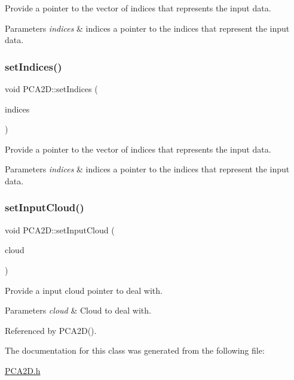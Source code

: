 Provide a pointer to the vector of indices that represents the input data. 


\begin{DoxyParams}{Parameters}
{\em indices} & indices a pointer to the indices that represent the input data. \\
\hline
\end{DoxyParams}
\mbox{\label{classPCA2D_aa5b9ccb12b5ce673ac851a2a5c4f4f97}} 
\subsubsection{\texorpdfstring{set\+Indices()}{setIndices()}\hspace{0.1cm}{\footnotesize\ttfamily [5/5]}}
{\footnotesize\ttfamily void P\+C\+A2\+D\+::set\+Indices (\begin{DoxyParamCaption}\item[{const std\+::vector$<$ int $>$ \&}]{indices }\end{DoxyParamCaption})}



Provide a pointer to the vector of indices that represents the input data. 


\begin{DoxyParams}{Parameters}
{\em indices} & indices a pointer to the indices that represent the input data. \\
\hline
\end{DoxyParams}
\mbox{\label{classPCA2D_ad3583e82b8d9b97f3f7253fd78af1dcc}} 
\subsubsection{\texorpdfstring{set\+Input\+Cloud()}{setInputCloud()}}
{\footnotesize\ttfamily void P\+C\+A2\+D\+::set\+Input\+Cloud (\begin{DoxyParamCaption}\item[{const \hyperlink{Normal2dEstimation_8h_a389a43addc496dc19a5bb0575cc60bc4}{Const\+Ptr\+Cloud} \&}]{cloud }\end{DoxyParamCaption})}



Provide a input cloud pointer to deal with. 


\begin{DoxyParams}{Parameters}
{\em cloud} & Cloud to deal with. \\
\hline
\end{DoxyParams}


Referenced by P\+C\+A2\+D().



The documentation for this class was generated from the following file\+:\begin{DoxyCompactItemize}
\item 
\hyperlink{PCA2D_8h}{P\+C\+A2\+D.\+h}\end{DoxyCompactItemize}
